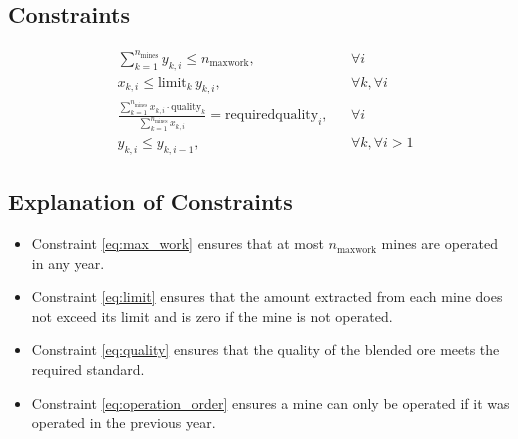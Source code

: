 \documentclass{article}
\begin{document}
\subsection*{Constraints}
\begin{align}
    & \sum_{k=1}^{n_{\text{mines}}} y_{k,i} \leq n_{\text{maxwork}}, && \forall i \label{eq:max_work}\\
    & x_{k,i} \leq \text{limit}_k \, y_{k,i}, && \forall k, \forall i \label{eq:limit}\\
    & \frac{\sum_{k=1}^{n_{\text{mines}}} x_{k,i} \cdot \text{quality}_k}{\sum_{k=1}^{n_{\text{mines}}} x_{k,i}} = \text{requiredquality}_i, && \forall i \label{eq:quality}\\
    & y_{k,i} \leq y_{k,i-1}, && \forall k, \forall i > 1 \label{eq:operation_order}
\end{align}

\subsection*{Explanation of Constraints}
\begin{itemize}
    \item Constraint \eqref{eq:max_work} ensures that at most $n_{\text{maxwork}}$ mines are operated in any year.
    \item Constraint \eqref{eq:limit} ensures that the amount extracted from each mine does not exceed its limit and is zero if the mine is not operated.
    \item Constraint \eqref{eq:quality} ensures that the quality of the blended ore meets the required standard.
    \item Constraint \eqref{eq:operation_order} ensures a mine can only be operated if it was operated in the previous year.
\end{itemize}
\end{document}
